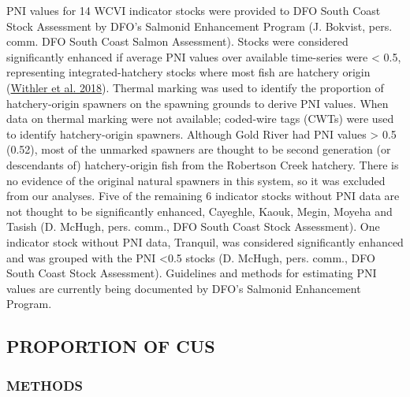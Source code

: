 \documentclass[11pt]{book}
\begin{document}
PNI values for 14 WCVI indicator stocks were provided to DFO South Coast Stock Assessment by DFO's Salmonid Enhancement Program (J. Bokvist, pers. comm. DFO South Coast Salmon Assessment). Stocks were considered significantly enhanced if average PNI values over available time-series were \textless{} 0.5, representing integrated-hatchery stocks where most fish are hatchery origin (\protect\hyperlink{ref-withlerGeneticallyBasedTargets2018}{Withler et al. 2018}). Thermal marking was used to identify the proportion of hatchery-origin spawners on the spawning grounds to derive PNI values. When data on thermal marking were not available; coded-wire tags (CWTs) were used to identify hatchery-origin spawners. Although Gold River had PNI values \textgreater{} 0.5 (0.52), most of the unmarked spawners are thought to be second generation (or descendants of) hatchery-origin fish from the Robertson Creek hatchery. There is no evidence of the original natural spawners in this system, so it was excluded from our analyses. Five of the remaining 6 indicator stocks without PNI data are not thought to be significantly enhanced, Cayeghle, Kaouk, Megin, Moyeha and Tasish (D. McHugh, pers. comm., DFO South Coast Stock Assessment). One indicator stock without PNI data, Tranquil, was considered significantly enhanced and was grouped with the PNI \textless0.5 stocks (D. McHugh, pers. comm., DFO South Coast Stock Assessment). Guidelines and methods for estimating PNI values are currently being documented by DFO's Salmonid Enhancement Program.

\hypertarget{proportion-of-cus}{%
\subsection{PROPORTION OF CUS}\label{proportion-of-cus}}

\hypertarget{methods-2}{%
\subsubsection{METHODS}\label{methods-2}}
\end{document}

